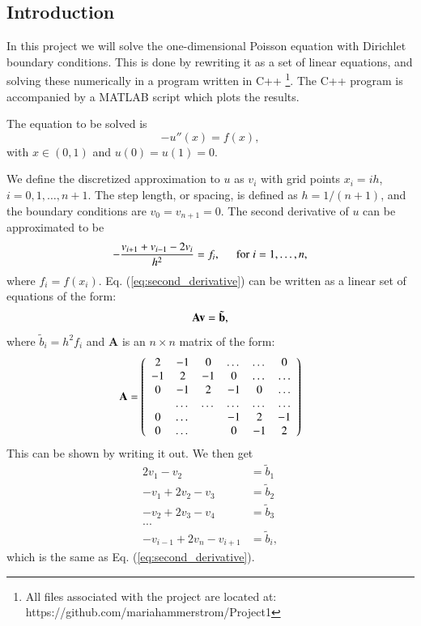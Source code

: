 \documentclass{article}
\begin{document}
\begin{multicols}{2}

\section{Introduction}
In this project we will solve the one-dimensional Poisson equation with Dirichlet boundary conditions. This is done by rewriting it as a set of linear equations, and solving these numerically in a program written in C++ \footnote{All files associated with the project are located at: https://github.com/mariahammerstrom/Project1}. The C++ program is accompanied by a MATLAB script which plots the results. 

The equation to be solved is
\begin{equation}\label{eq:Poisson}
	-u''(x) = f(x),
\end{equation}
with $x\in(0,1)$ and $u(0) = u(1) = 0$.

We define the discretized approximation to $u$ as $v_i$  with grid points $x_i=ih$, $i=0,1,\dots ,n+1$. The step length, or spacing, is defined as $h=1/(n+1)$, and the boundary conditions are $v_0 = v_{n+1} = 0$. The second derivative of $u$ can be approximated to be
\begin{equation}\label{eq:second_derivative}
   -\frac{v_{i+1}+v_{i-1}-2v_i}{h^2} = f_i,  \hspace{0.5cm} \mathrm{for} \hspace{0.1cm} i=1,\dots, n,
\end{equation}
where $f_i=f(x_i)$. Eq. (\ref{eq:second_derivative}) can be written as a linear set of equations of the form: 
\begin{equation}
	{\bf A}{\bf v} = \tilde{{\bf b}},
\end{equation}
where $\tilde{b}_i=h^2f_i$ and \textbf{A} is an $n\times n$ matrix of the form:
\begin{equation}
    {\bf A} = \left(\begin{array}{cccccc}
                           2& -1& 0 &\dots   & \dots &0 \\
                           -1 & 2 & -1 &0 &\dots &\dots \\
                           0&-1 &2 & -1 & 0 & \dots \\
                           & \dots   & \dots &\dots   &\dots & \dots \\
                           0&\dots   &  &-1 &2& -1 \\
                           0&\dots    &  & 0  &-1 & 2 \\
                      \end{array} \right)
\end{equation}
This can be shown by writing it out. We then get
\begin{align*}
	2v_1 - v_2 &= \tilde{b}_1 \\
	-v_1 + 2v_2 - v_3 &= \tilde{b}_2 \\
	-v_2 + 2v_3 - v_4 &= \tilde{b}_3 \\
	... \\
	-v_{i-1} + 2v_n - v_{i+1} &= \tilde{b}_i,
\end{align*}
which is the same as Eq. (\ref{eq:second_derivative}). 


\end{multicols}
\end{document}
